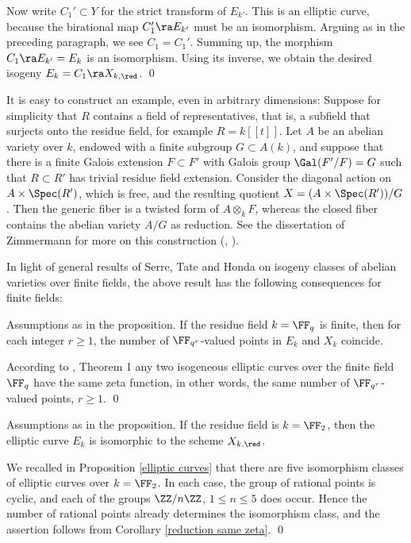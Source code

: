 Now write $C_1'\subset Y$ for the strict transform of  $E_{k'}$. This is an elliptic curve, because the birational map $C_1'\ra E_{k'}$
must be an  isomorphism.
Arguing as in the preceding paragraph, we see $C_1= C_1'$.
Summing up, the morphism $C_1\ra E_{k'}=E_k$ is an isomorphism. Using its inverse, we obtain
the desired isogeny   $E_k=C_1\ra   X_{k,\red} $.
\qed


It is easy to construct an example, even in arbitrary dimensions: Suppose for simplicity that $R$ contains a field of representatives,
that is, a subfield that surjects onto the residue field, for example $R=k[[t]]$.
Let $A$ be an abelian variety over $k$, endowed with a finite subgroup $G\subset A(k)$,
and suppose that there is a finite Galois extension $F\subset F'$ with
Galois group $\Gal(F'/F)=G$ such that $R\subset R'$ has trivial residue field extension.
Consider the diagonal action on $A\times\Spec(R')$, which is free,
and the resulting quotient $X=(A\times\Spec(R'))/G$. Then the generic fiber is a twisted form
of $A\otimes_k F$, whereas the closed fiber contains the abelian variety $A/G$ as reduction.
See the dissertation of Zimmermann  for more on this construction (\cite{Zimmermann-2019a}, \cite{Zimmermann-2021}).

In light of general results of Serre, Tate and Honda on isogeny classes of abelian varieties over finite fields,
the  above result has the following consequences for finite fields:

\begin{corollary}
\notready
\label{reduction same zeta}
Assumptions as in the proposition. If the residue field $k=\FF_q$ is finite,
then for each integer $r\geq 1$, the number of $\FF_{q^r}$-valued points
in $E_k$ and $X_k$ coincide.
\end{corollary}

\proof
According to  \cite{Tate-1982}, Theorem 1 any    two isogeneous elliptic curves over
the finite field $\FF_q$ have the same    zeta function, in other words,
the same number of $\FF_{q^r}$-valued points, $r\geq 1$.
\qed

\begin{corollary}
\notready
\label{reduction isomorphic}
Assumptions as in the proposition. If the residue field is $k=\FF_2$, then
the elliptic curve $E_k$ is isomorphic to the scheme $X_{k,\red}$.
\end{corollary}

\proof
We recalled in Proposition \ref{elliptic curves} that  there are five isomorphism classes of elliptic
curves over $k=\FF_2$. In each case, the group of rational points is cyclic, and each of the
groups $\ZZ/n\ZZ$, $1\leq n\leq 5$ does occur. Hence the number of rational points
already determines the isomorphism class, and the assertion follows from Corollary \ref{reduction same zeta}.
\qed


